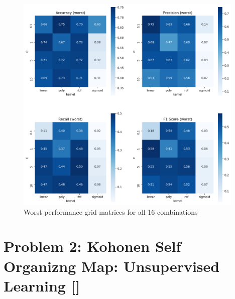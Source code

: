 \documentclass{tron}
\begin{document}
\begin{figure}[H]
\centering
	\includegraphics[height=400px]{../src_code/output/p1/unmodified/Summary_unmodified_worst}
	\caption{Worst performance grid matrices for all 16 combinations}
	\label{table:performance-grid:worst}
\end{figure}


\newpage
\section{Problem 2: Kohonen Self Organizng Map: Unsupervised Learning []}
%	
%	
%	
%	
\end{document}
